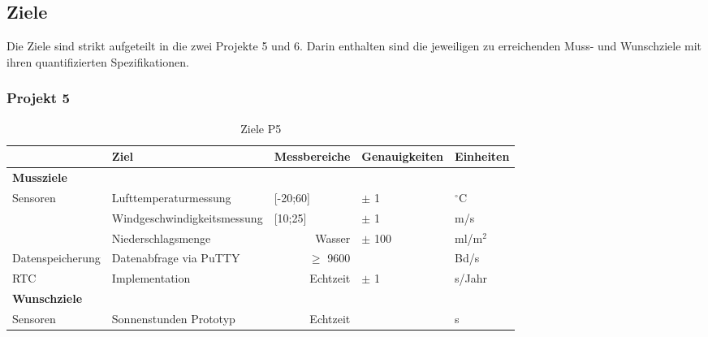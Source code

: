 \begin{landscape}
\subsection{Ziele}
\label{subsec:Ziele}
Die Ziele sind strikt aufgeteilt in die zwei Projekte 5 und 6. Darin enthalten sind die jeweiligen zu erreichenden Muss- und Wunschziele mit ihren quantifizierten Spezifikationen.

\subsubsection{Projekt 5}
\label{subsubsec:Projekt5}
\begin{table}[h]
  \centering
  \caption{Ziele P5}
    \begin{tabular}{r|l|r|l|l}
          & \textbf{Ziel} & \multicolumn{1}{l|}{\textbf{Messbereiche}} & \textbf{Genauigkeiten} & \textbf{Einheiten} \\
    \toprule
    \multicolumn{1}{l}{\textbf{Mussziele}} & \multicolumn{1}{r}{} & \multicolumn{1}{r}{} & \multicolumn{1}{r}{} &  \\
    \toprule
    \multicolumn{1}{l|}{Sensoren} & Lufttemperaturmessung & \multicolumn{1}{l|}{[-20;60]} & $\pm$ 1 & $^\circ$C \\
\cline{2-5}          & Windgeschwindigkeitsmessung & \multicolumn{1}{l|}{[10;25]} & $\pm$ 1   & m/s \\
\cline{2-5} & Niederschlagsmenge &   Wasser    & $\pm$ 100 & ml/m$^2$ \\
    \hline
    \multicolumn{1}{l|}{Datenspeicherung} & Datenabfrage via PuTTY &   $\geq$ 9600    &       &  Bd/s\\
    \hline
    \multicolumn{1}{l|}{RTC} & Implementation &   Echtzeit    & $\pm$ 1   & s/Jahr \\
\bottomrule
\multicolumn{1}{l}{\textbf{Wunschziele}} & \multicolumn{1}{l}{} & \multicolumn{1}{l}{} & \multicolumn{1}{l}{} &  \\
    \toprule
    \multicolumn{1}{l|}{Sensoren} & Sonnenstunden Prototyp &   Echtzeit    &       & s \\
    \bottomrule
    \end{tabular}%
  \label{tab:ZieleP5}%
\end{table}%


\end{landscape}
